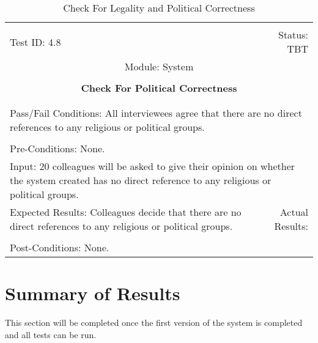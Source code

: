 \documentclass[titlepage]{article}
\begin{document}
\begin{center}%
\begin{table}
\begin{tabular}{|l r|}\hline&\\[-2mm]
	Test ID: 4.8	&Status: TBT\\[-3mm]
	\multicolumn{2}{|c|}{Module: System}\\&\\
	\multicolumn{2}{|c|}{\textbf{\large{Check For Political Correctness}}}\\&\\\hline&\\[-3mm]
	\multicolumn{2}{|p{\textwidth}|}{Pass/Fail Conditions: All interviewees agree that there are no direct references to any religious or political groups.}\\[1mm]\hline&\\[-3mm]
	\multicolumn{2}{|p{\textwidth}|}{Pre-Conditions: None.}\\[4mm]
	\multicolumn{2}{|p{\textwidth}|}{Input: 20 colleagues will be asked to give their opinion on whether the system created has no direct reference to any religious or political groups.}\\[2mm]\hline
	\multicolumn{1}{|p{0.49\textwidth}}{Expected Results: Colleagues decide that there are no direct references to any religious or political groups.}	&\multicolumn{1}{|p{0.45\textwidth}|}{Actual Results: }\\\hline&\\[-3mm]
	\multicolumn{2}{|p{\textwidth}|}{Post-Conditions: None.}\\\hline
\end{tabular}
\caption{Check For Legality and Political Correctness}
\end{table}
\end{center}




\section{Summary of Results}
This section will be completed once the first version of the system is completed and all tests can be run.
\end{document}
